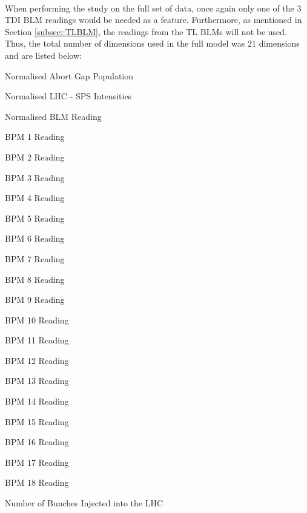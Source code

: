 \paragraph{ }When performing the study on the full set of data, once again only one of the 3 \acs{TDI} \acs{BLM} readings would be needed as a feature. Furthermore, as mentioned in Section \ref{subsec::TLBLM}, the readings from the \acs{TL} \acs{BLM}s will not be used. Thus, the total number of dimensions used in the full model was 21 dimensions and are listed below:

\begin{enumerate}
	\begin{minipage}[t]{0.475\linewidth}
		\item Normalised Abort Gap Population
		\item Normalised \acs{LHC} - \acs{SPS} Intensities
		\item Normalised \acs{BLM} Reading
		\item \acs{BPM} 1 Reading
		\item \acs{BPM} 2 Reading
		\item \acs{BPM} 3 Reading
		\item \acs{BPM} 4 Reading
		\item \acs{BPM} 5 Reading
		\item \acs{BPM} 6 Reading
		\item \acs{BPM} 7 Reading
		\item \acs{BPM} 8 Reading
	\end{minipage}	
	\hspace{0.25cm}
	\begin{minipage}[t]{0.475\linewidth}
		\item \acs{BPM} 9 Reading
		\item \acs{BPM} 10 Reading
		\item \acs{BPM} 11 Reading
		\item \acs{BPM} 12 Reading
		\item \acs{BPM} 13 Reading
		\item \acs{BPM} 14 Reading
		\item \acs{BPM} 15 Reading
		\item \acs{BPM} 16 Reading
		\item \acs{BPM} 17 Reading
		\item \acs{BPM} 18 Reading
		\item Number of Bunches Injected into the \acs{LHC}
	\end{minipage}	
\end{enumerate}

